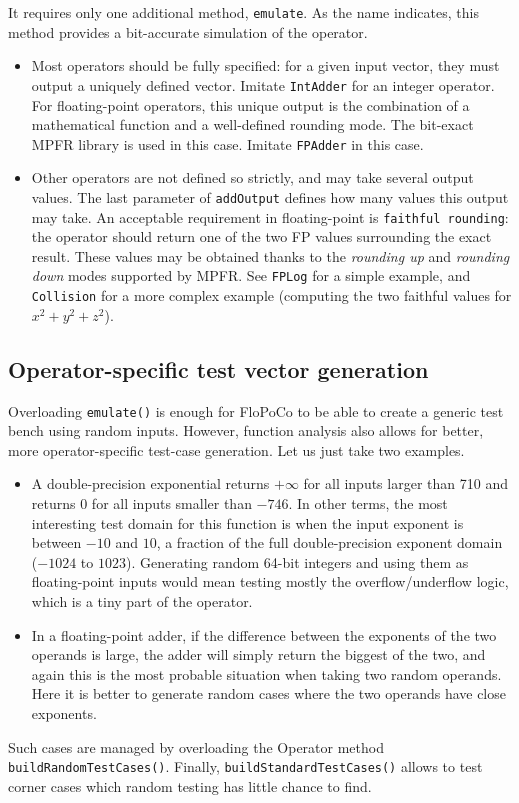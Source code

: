 \documentclass{article}
\begin{document}
It requires only one additional method, \texttt{emulate}. As the name
indicates, this method provides a bit-accurate simulation of the operator. 
\begin{itemize}
\item Most operators should be fully specified: for a given input
  vector, they must output a uniquely defined vector. Imitate
  \texttt{IntAdder} for an integer operator. For floating-point
  operators, this unique output is the combination of a mathematical
  function and a well-defined rounding mode. The bit-exact MPFR
  library is used in this case. Imitate \texttt{FPAdder} in this case.

\item Other operators are not defined so strictly, and may take
  several output values. The last parameter of \texttt{addOutput}
  defines how many values this output may take. An acceptable
  requirement in floating-point is \texttt{faithful rounding}: the
  operator should return one of the two FP values surrounding the
  exact result. These values may be obtained thanks to the
  \emph{rounding up} and \emph{rounding down} modes supported by
  MPFR. See \texttt{FPLog} for a simple example, and
  \texttt{Collision} for a more complex example (computing the two
  faithful values for $x^2+y^2+z^2$).
\end{itemize}

\subsection{Operator-specific test  vector generation}
Overloading \texttt{\small emulate()} is enough for FloPoCo to be able
to create a generic test bench using random inputs. However, function
analysis also allows for better, more operator-specific test-case
generation. Let us just take two examples.

\begin{itemize}\item 
  A double-precision exponential returns $+\infty$ for all inputs
  larger than 710 and returns $0$ for all inputs smaller than
  $-746$. In other terms, the most interesting test domain for this
  function is when the input exponent is between $-10$ and $10$, a
  fraction of the full double-precision exponent domain ($-1024$ to
  $1023$). Generating random 64-bit integers and using them as
  floating-point inputs would mean testing mostly the
  overflow/underflow logic, which is a tiny part of the operator.


\item In a floating-point adder, if the difference between the exponents
  of the two operands is large, the adder will simply return the
  biggest of the two, and again this is the most probable situation
  when taking two random operands. Here it is better to generate
  random cases where the two operands have close exponents.
\end{itemize}
  Such cases are managed by overloading the Operator method
  \texttt{\small buildRandomTestCases()}. Finally,
  \texttt{\small buildStandardTestCases()} allows to test corner cases which
  random testing has little chance to find.
\end{document}
